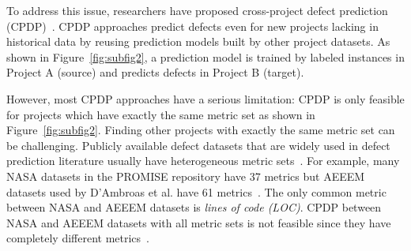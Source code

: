 To address this issue, researchers
have proposed cross-project defect
prediction (CPDP)~\cite{He12, Ma12, Nam13, Rahman12, Turhan09, Zimmermann09}.
CPDP approaches predict defects even for new projects lacking
in historical data by reusing prediction models built by other project
datasets. As shown in Figure~\ref{fig:subfig2}, a prediction model is trained by
labeled instances in Project A (source) and predicts defects in Project B (target).

% 

However, most CPDP approaches have a serious limitation:
CPDP is only feasible for projects which have exactly the same metric
set as shown in Figure~\ref{fig:subfig2}. Finding other projects with exactly
the same metric set can be challenging. Publicly available defect
datasets that are widely used in defect prediction literature usually have
heterogeneous metric sets~\cite{DAmbros12,promise12,Nam13}.
For example, many NASA datasets in the PROMISE repository have 37 metrics but
AEEEM datasets used by D'Ambroas et al. have 61
metrics~\cite{DAmbros12,promise12}.
The only common metric between NASA and AEEEM datasets is {\em lines of
code (LOC)}.
CPDP between NASA and AEEEM
datasets with all metric sets is not feasible since they have
completely different metrics~\cite{Turhan09}.


